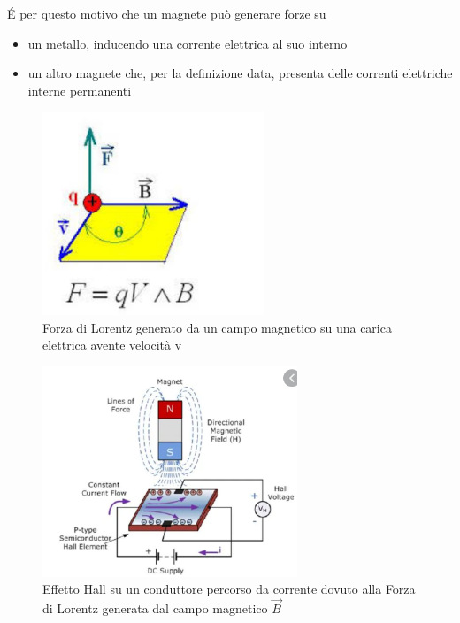 \documentclass[17pt]{extarticle}
\begin{document}
\begin{enumerate}



\'E per questo motivo che un magnete può generare forze su
\begin{itemize}
	\item un metallo, inducendo una corrente elettrica al suo interno
	\item un altro magnete che, per la definizione data, presenta delle correnti elettriche interne permanenti
\end{itemize}
	
	
	
	
	
	 

	
\begin{figure}[bh!]
	\centering
   	\includegraphics[width=2.6in]{ForzaLorentz.png}		%
  	\caption{Forza di Lorentz generato da un campo magnetico su una carica elettrica avente velocità v}
   	\label{fig:ForzaLorentz}%
\end{figure}	
	
	
\begin{figure}[th]		%
	\centering
   	\includegraphics[width=3.0in]{EffettoHall.png}		%
  	\caption{Effetto Hall su un conduttore percorso da corrente dovuto alla Forza di Lorentz generata dal campo magnetico $\vec{B}$}
   	\label{fig:EffettoHall}%
\end{figure}	



\end{enumerate}
\end{document}
